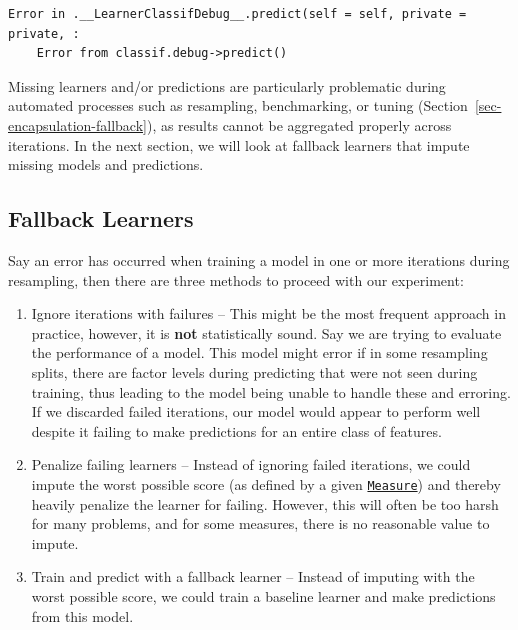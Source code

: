\begin{verbatim}
Error in .__LearnerClassifDebug__.predict(self = self, private = private, :
	Error from classif.debug->predict()
\end{verbatim}

Missing learners and/or predictions are particularly problematic during
automated processes such as resampling, benchmarking, or tuning
(Section~\ref{sec-encapsulation-fallback}), as results cannot be
aggregated properly across iterations. In the next section, we will look
at fallback learners that impute missing models and predictions.

\hypertarget{sec-fallback}{%
\subsection{\texorpdfstring{Fallback
Learners}{Fallback Learners}}\label{sec-fallback}}

Say an error has occurred when training a model in one or more
iterations during resampling, then there are three methods to proceed
with our experiment:

\begin{enumerate}
\def\labelenumi{\arabic{enumi}.}
\tightlist
\item
  Ignore iterations with failures -- This might be the most frequent
  approach in practice, however, it is \textbf{not} statistically sound.
  Say we are trying to evaluate the performance of a model. This model
  might error if in some resampling splits, there are factor levels
  during predicting that were not seen during training, thus leading to
  the model being unable to handle these and erroring. If we discarded
  failed iterations, our model would appear to perform well despite it
  failing to make predictions for an entire class of features.
\item
  Penalize failing learners -- Instead of ignoring failed iterations, we
  could impute the worst possible score (as defined by a given
  \href{https://mlr3.mlr-org.com/reference/Measure.html}{\texttt{Measure}})
  and thereby heavily penalize the learner for failing. However, this
  will often be too harsh for many problems, and for some measures,
  there is no reasonable value to impute.
\item
  Train and predict with a fallback
  learner -- Instead of imputing with the worst
  possible score, we could train a baseline learner and make predictions
  from this model.
\end{enumerate}

